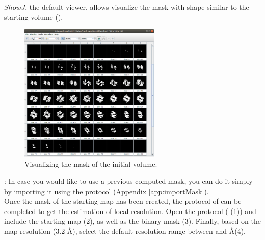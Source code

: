  $ShowJ$, the default \scipion viewer, allows visualize the mask with shape similar to the starting volume ().

 \begin{figure}[H]
  \centering 
  \captionsetup{width=.7\linewidth} 
  \includegraphics[width=0.60\textwidth]
  {Images/Fig54}
  \caption{Visualizing the mask of the initial volume.}
  \label{fig:create3Dmask_2}
  \end{figure}
  
: In case you would like to use a previous computed mask, you can do it simply by importing it using the protocol  (Appendix \ref{app:importMask}).\\
  
Once the mask of the starting map has been created, the protocol of  can be completed to get the estimation of local resolution. Open the protocol ( (1)) and include the starting map (2), as well as the binary mask (3). Finally, based on the map resolution (3.2 \AA), select the default resolution range between  and  \AA (4). 

